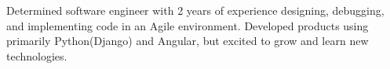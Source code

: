 %
%
%
\par{
Determined software engineer with 2 years of experience designing, debugging, and implementing code in an Agile environment. Developed products using primarily Python(Django) and Angular, but excited to grow and learn new technologies.
\emptySeparator
}